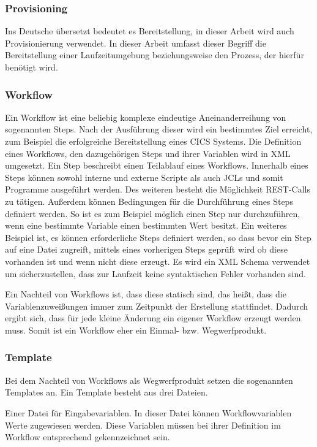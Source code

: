 \subsubsection{Provisioning}
Ins Deutsche übersetzt bedeutet es Bereitstellung, in dieser Arbeit wird auch Provisionierung verwendet.
In dieser Arbeit umfasst dieser Begriff die Bereitstellung einer Laufzeitumgebung beziehungsweise den Prozess, der hierfür benötigt wird.

\subsubsection{Workflow}\label{sssec:workflow}
Ein Workflow ist eine beliebig komplexe eindeutige Aneinanderreihung von sogenannten Steps.
Nach der Ausführung dieser wird ein bestimmtes Ziel erreicht, zum Beispiel die erfolgreiche Bereitstellung eines CICS Systems.
Die Definition eines Workflows, den dazugehörigen Steps und ihrer Variablen wird in XML umgesetzt.
Ein Step beschreibt einen Teilablauf eines Workflows.
Innerhalb eines Steps können sowohl interne und externe Scripte als auch JCLs und somit Programme ausgeführt werden.
Des weiteren besteht die Möglichkeit REST-Calls zu tätigen.
Außerdem können Bedingungen für die Durchführung eines Steps definiert werden.
So ist es zum Beispiel möglich einen Step nur durchzuführen, wenn eine bestimmte Variable einen bestimmten Wert besitzt.
Ein weiteres Beispiel ist, es können erforderliche Steps definiert werden, so dass bevor ein Step auf eine Datei zugreift, mittels eines vorherigen Steps geprüft wird ob diese vorhanden ist und wenn nicht diese erzeugt.
Es wird ein XML Schema verwendet um sicherzustellen, dass zur Laufzeit keine syntaktischen Fehler vorhanden sind.
\cite{Rotthove.2018}

Ein Nachteil von Workflows ist, dass diese statisch sind, das heißt, dass die Variablenzuweißungen immer zum Zeitpunkt der Erstellung stattfindet.
Dadurch ergibt sich, dass für jede kleine Änderung ein eigener Workflow erzeugt werden muss.
Somit ist ein Workflow eher ein Einmal- bzw. Wegwerfprodukt.

\subsubsection{Template}
Bei dem Nachteil von Workflows als Wegwerfprodukt setzen die sogenannten Templates an.
Ein Template besteht aus drei Dateien.

Einer Datei für Eingabevariablen.
In dieser Datei können Workflowvariablen Werte zugewiesen werden.
Diese Variablen müssen bei ihrer Definition im Workflow entsprechend gekennzeichnet sein.

